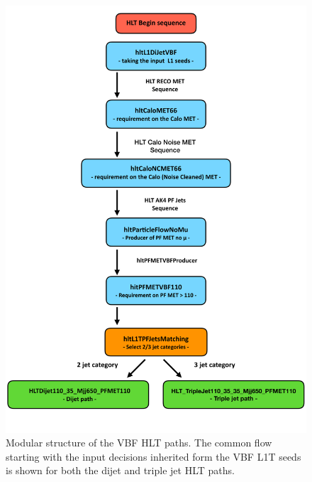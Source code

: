 \begin{figure}[!htbp]
  \centering
    \includegraphics[width=\textwidth]{CMS_experiment/VBF_HLT_structure.pdf}
  \caption{Modular structure of the VBF HLT paths. The common flow starting with the input decisions inherited form the VBF L1T seeds is shown for both the dijet and triple jet HLT paths.}
  \label{fig:VBF_HLT}
\end{figure}

